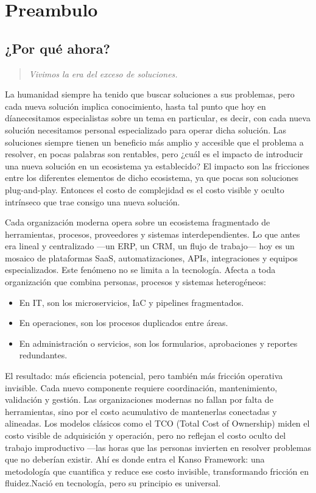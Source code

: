 \chapter{Preambulo}\label{chap:one}

\section{¿Por qué ahora?}
\begin{quote}
\textit{Vivimos la era del exceso de soluciones.}
\end{quote}

La humanidad siempre ha tenido que buscar soluciones a sus problemas, pero cada nueva solución implica 
conocimiento, hasta tal punto que hoy en díanecesitamos especialistas sobre un tema en particular, es decir, 
con cada nueva solución necesitamos personal especializado para operar dicha solución. Las soluciones siempre 
tienen un beneficio más amplio y accesible que el problema a resolver, en pocas palabras son rentables, 
pero ¿cuál es el impacto de introducir una nueva solución en un ecosistema ya establecido? 
El impacto son las fricciones entre los diferentes elementos de dicho ecosistema, ya que pocas son 
soluciones plug-and-play. Entonces el costo de complejidad es el costo visible y oculto intrínseco que 
trae consigo una nueva solución.

Cada organización moderna opera sobre un ecosistema fragmentado de herramientas, procesos, proveedores y 
sistemas interdependientes. Lo que antes era lineal y centralizado ---un ERP, un CRM, un flujo de trabajo--- 
hoy es un mosaico de plataformas SaaS, automatizaciones, APIs, integraciones y equipos especializados.
Este fenómeno no se limita a la tecnología. Afecta a toda organización que combina personas, procesos y 
sistemas heterogéneos:

\begin{itemize}
    \item En IT, son los microservicios, IaC y pipelines fragmentados.
    \item En operaciones, son los procesos duplicados entre áreas.
    \item En administración o servicios, son los formularios, aprobaciones y reportes redundantes.
\end{itemize}

El resultado: más eficiencia potencial, pero también más fricción operativa invisible.
Cada nuevo componente requiere coordinación, mantenimiento, validación y gestión.
Las organizaciones modernas no fallan por falta de herramientas, sino por el costo 
acumulativo de mantenerlas conectadas y alineadas.
Los modelos clásicos como el TCO (Total Cost of Ownership) miden el costo visible de adquisición y operación, 
pero no reflejan el costo oculto del trabajo improductivo ---las horas que las personas invierten en resolver 
problemas que no deberían existir.
Ahí es donde entra el Kanso Framework: una metodología que cuantifica y reduce ese costo invisible, transformando 
fricción en fluidez.Nació en tecnología, pero su principio es universal.

